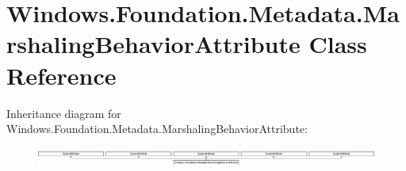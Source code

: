 \hypertarget{class_windows_1_1_foundation_1_1_metadata_1_1_marshaling_behavior_attribute}{}\section{Windows.\+Foundation.\+Metadata.\+Marshaling\+Behavior\+Attribute Class Reference}
\label{class_windows_1_1_foundation_1_1_metadata_1_1_marshaling_behavior_attribute}
Inheritance diagram for Windows.\+Foundation.\+Metadata.\+Marshaling\+Behavior\+Attribute\+:\begin{figure}[H]
\begin{center}
\leavevmode
\includegraphics[height=0.625698cm]{class_windows_1_1_foundation_1_1_metadata_1_1_marshaling_behavior_attribute}
\end{center}
\end{figure}
